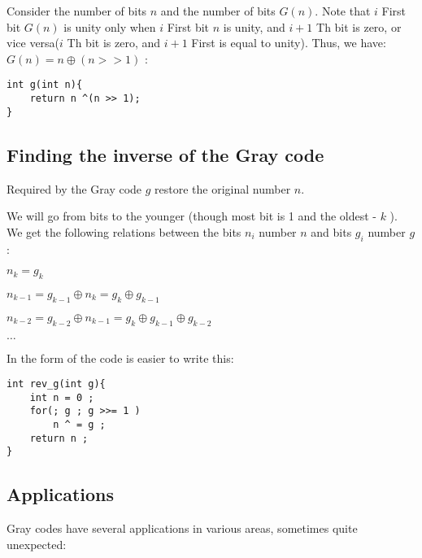 Consider the number of bits $n$ and the number of bits $G (n)$. Note that $i$ First bit $G (n)$ is unity only when $i$ First bit $n$ is unity, and $i +1$ Th bit is zero, or vice versa($i$ Th bit is zero, and $i +1$ First is equal to unity). Thus, we have: $G (n) = n \oplus (n >> 1)$ :

\begin{verbatim}
int g(int n){
    return n ^(n >> 1);
} 
\end{verbatim}
\subsection{ Finding the inverse of the Gray code }

Required by the Gray code $g$ restore the original number $n$.

We will go from bits to the younger (though most bit is 1 and the oldest - $k$ ). We get the following relations between the bits $n_i$ number $n$ and bits $g_i$ number $g$ :

$n_k = g_k$

$n_{k-1}=g_{k-1}\oplus n_{k}=g_{k}\oplus g_{k-1}$

$n_{k-2}=g_{k-2}\oplus n_{k-1}=g_{k}\oplus g_{k-1}\oplus g_{k-2}$

$\ldots$

In the form of the code is easier to write this:

\begin{verbatim}
int rev_g(int g){
    int n = 0 ;
    for(; g ; g >>= 1 )
        n ^ = g ;
    return n ;
} 
\end{verbatim}
\subsection{ Applications }

Gray codes have several applications in various areas, sometimes quite unexpected:

